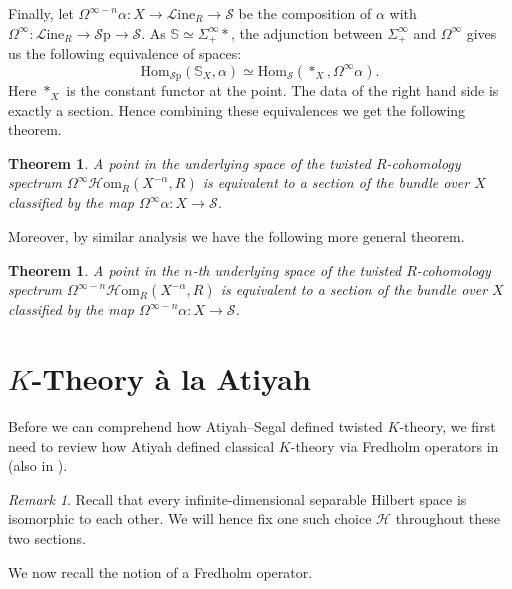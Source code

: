 \documentclass[a4paper]{book}
\newcommand{\lH}{\mathcal{H}}
\newcommand{\lL}{\mathcal{L}}
\newcommand{\lS}{\mathcal{S}}
\newcommand{\bS}{\mathbb{S}}
\newcommand{\Sp}{\lS\mathrm{p}} %
\newcommand{\Hom}{\lH\mathrm{om}} %
\renewcommand{\hom}{\mathrm{Hom}} %
\renewcommand{\Line}{\lL\mathrm{ine}} %
\newtheorem{theorem}[equation]{Theorem}
\theoremstyle{definition}
\theoremstyle{remark}
\newtheorem{remark}[equation]{Remark}
\numberwithin{equation}{section}
\begin{document}
Finally, let $\Omega^{\infty-n} \alpha \colon X \to \Line_R \to \lS$ be the composition of $\alpha$ with $\Omega^\infty\colon \Line_R \to \Sp \to \lS$. As $\bS \simeq \Sigma^\infty_+ *$, the adjunction between $\Sigma^\infty_+$	and $\Omega^\infty$ gives us the following equivalence of spaces:
\[\hom_{\Sp}(\bS_X,\alpha) \simeq \hom_{\lS}(*_X,\Omega^\infty\alpha).\]
Here $*_X$ is the constant functor at the point. The data of the right hand side is exactly a section. Hence combining these equivalences we get the following theorem.

\begin{theorem}
 A point in the underlying space of the twisted $R$-cohomology spectrum $\Omega^\infty\Hom_R(X^{-\alpha},R)$ is equivalent to a section of the bundle over $X$ classified by the map $\Omega^\infty \alpha \colon X \to \lS$.
\end{theorem}

Moreover, by similar analysis we have the following more general theorem.

\begin{theorem} \label{thm:twisted_R_cohomology_section}
 A point in the $n$-th underlying space of the twisted $R$-cohomology spectrum $\Omega^{\infty-n}\Hom_R(X^{-\alpha},R)$ is equivalent to a section of the bundle over $X$ classified by the map $\Omega^{\infty-n} \alpha \colon X \to \lS$.
\end{theorem}

\section{\texorpdfstring{$K$}{K}-Theory \texorpdfstring{{\` a}}{a} la Atiyah}
Before we can comprehend how Atiyah--Segal defined twisted $K$-theory, we first need to review how Atiyah defined classical $K$-theory via Fredholm operators in \cite{atiyah1967ktheory} (also in \cite{janich1965fredholm}). 

\begin{remark}
	Recall that every infinite-dimensional separable Hilbert space is isomorphic to each other. We will hence fix one such choice $\lH$ throughout these two sections.
\end{remark}


We now recall the notion of a Fredholm operator.
\end{document}
